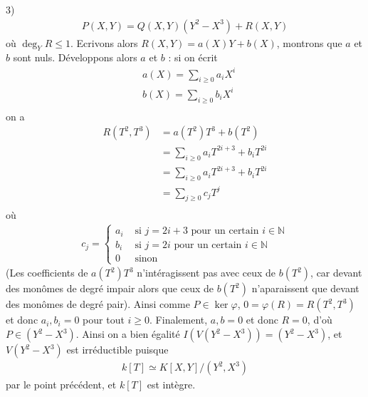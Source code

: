 \documentclass[11pt]{article}
\begin{document}
\begin{question}{3)}
\begin{align*}
            P(X,Y) = Q(X,Y)(Y^2 - X^3) + R(X,Y)
        \end{align*}
        où $\deg_Y R \leq 1$. Ecrivons alors $R(X,Y) = a(X)Y + b(X)$, montrons que $a$ et $b$ sont nuls. Développons alors $a$ et $b$ : si on écrit 
        \begin{align*}
            &a(X) = \sum_{i \geq 0} a_i X^i \\
            &b(X) = \sum_{i \geq 0} b_i X^i \\
        \end{align*}
        on a 
        \begin{align*}
            R(T^2, T^3) &= a(T^2)T^3 + b(T^2) \\
            &= \sum_{i \geq 0} a_i T^{2i + 3} + b_i T^{2i} \\
            &= \sum_{i \geq 0} a_i T^{2i + 3} + b_i T^{2i} \\
            &= \sum_{j \geq 0} c_j T^j \\
        \end{align*}
        où
        \begin{align*}
            c_j =
            \begin{cases}
                a_i &\text{ si } j = 2i + 3 \text{ pour un certain } i \in \mathbb{N} \\
                b_i &\text{ si } j = 2i \text{ pour un certain } i \in \mathbb{N} \\
                0 & \text{ sinon}
            \end{cases}
        \end{align*}
        (Les coefficients de $a(T^2)T^3$ n'intéragissent pas avec ceux de $b(T^2)$, car devant des monômes de degré impair alors que ceux de $b(T^2)$ n'aparaissent que devant des monômes de degré pair). Ainsi comme $P \in \ker \varphi$, $0 = \varphi(R) = R(T^2, T^3)$ et donc $a_i, b_i = 0$ pour tout $i \geq 0$. Finalement, $a,b = 0$ et donc $R = 0$, d'où $P \in (Y^2 - X^3)$. Ainsi on a bien égalité $I(V(Y^2 - X^3)) = (Y^2 - X^3)$, et $V(Y^2 - X^3)$ est irréductible puisque
        \begin{align*}
            k[T] \simeq K[X,Y]/(Y^2 , X^3)
        \end{align*}
        par le point précédent, et $k[T]$ est intègre.
    \end{question}
\end{document}
